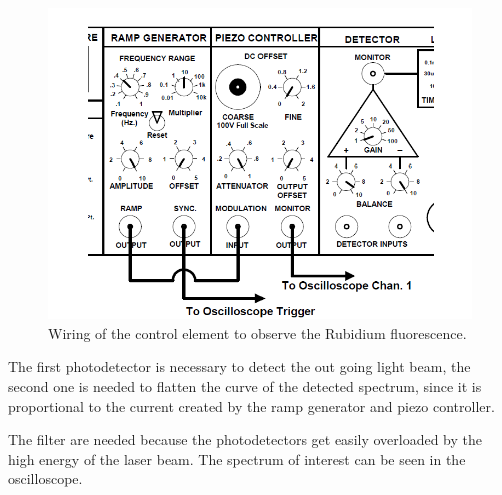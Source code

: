 \begin{figure}[H]
	\centering
	\includegraphics[width=\textwidth]{setup1.png}
	\caption{Wiring of the control element to observe the Rubidium fluorescence. \cite{V60}}
	\label{fig:set1}
\end{figure}

\noindent
The first photodetector is necessary to detect the out going light beam, the second one is needed to flatten
the curve of the detected spectrum, since it is proportional to the current created by the ramp generator and
piezo controller. 

\noindent
The filter are needed because the photodetectors get easily overloaded by the high energy of the laser beam.
The spectrum of interest can be seen in the oscilloscope.




